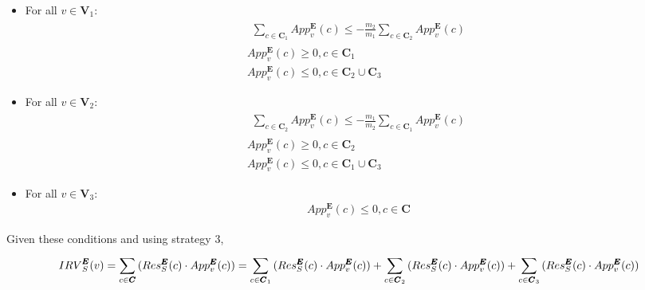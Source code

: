 \documentclass{article}
\begin{document}
\begin{itemize}
    \item For all $v \in \pmb{V}_{1}$:\\
    \begin{gather}
    \begin{split}
        \sum^{}_{c \in \pmb{C}_{1}}{App^{\pmb{E}}_{v}(c)} \leq -\frac{{m}_{2}}{{m}_{1}}\sum^{}_{c \in \pmb{C}_{2}}{App^{\pmb{E}}_{v}(c)}
    \end{split}\\
    App^{\pmb{E}}_{v}(c) \geq 0, c \in \pmb{C}_{1}\\
    App^{\pmb{E}}_{v}(c) \leq 0, c \in \pmb{C}_{2} \cup \pmb{C}_{3}
    \end{gather}
    \item For all $v \in \pmb{V}_{2}$:\\
    \begin{gather}
    \begin{split}
        \sum^{}_{c \in \pmb{C}_{2}}{App^{\pmb{E}}_{v}(c)} \leq -\frac{{m}_{1}}{{m}_{2}}\sum^{}_{c \in \pmb{C}_{1}}{App^{\pmb{E}}_{v}(c)}
    \end{split}\\
    App^{\pmb{E}}_{v}(c) \geq 0, c \in \pmb{C}_{2}\\
    App^{\pmb{E}}_{v}(c) \leq 0, c \in \pmb{C}_{1} \cup \pmb{C}_{3}
    \end{gather}
    \item For all $v \in \pmb{V}_{3}$:\\
    \begin{gather}
        App^{\pmb{E}}_{v}(c) \leq 0, c \in \pmb{C}
    \end{gather}
\end{itemize}

Given these conditions and using strategy 3,
\begin{equation}
    {IRV}^{\pmb{E}}_{S}(v) = \sum^{}_{c \in \pmb{C}}{(Res^{\pmb{E}}_{S}(c) \cdot App^{\pmb{E}}_{v}(c))}\\
    = \sum^{}_{c \in \pmb{C}_{1}}{(Res^{\pmb{E}}_{S}(c) \cdot App^{\pmb{E}}_{v}(c))}+\sum^{}_{c \in \pmb{C}_{2}}{(Res^{\pmb{E}}_{S}(c) \cdot App^{\pmb{E}}_{v}(c))}+\sum^{}_{c \in \pmb{C}_{3}}{(Res^{\pmb{E}}_{S}(c) \cdot App^{\pmb{E}}_{v}(c))}
\end{equation}\\
\end{document}

